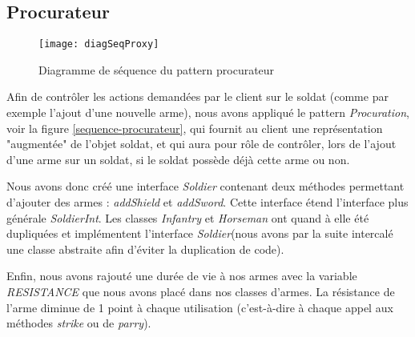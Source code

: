 \subsection{Procurateur}
\begin{figure}[h]
\begin{center}
    \texttt{[image: diagSeqProxy]}
\end{center}
    \caption{Diagramme de séquence du pattern procurateur}
    \label{sequence-procurateur}
\end{figure}

Afin de contrôler les actions demandées par le client sur le soldat (comme par exemple l'ajout d'une nouvelle arme), nous avons appliqué le pattern \emph{Procuration}, voir la figure \vref{sequence-procurateur}, qui fournit au client une représentation "augmentée" de l'objet soldat, et qui aura pour rôle de contrôler, lors de l'ajout d'une arme sur un soldat, si le soldat possède déjà cette arme ou non.

Nous avons donc créé une interface \emph{Soldier} contenant deux méthodes permettant d'ajouter des armes : \emph{addShield} et \emph{addSword}. Cette interface étend l'interface plus générale \emph{SoldierInt}. 
Les classes \emph{Infantry} et \emph{Horseman} ont quand à elle été dupliquées et implémentent l'interface \emph{Soldier}(nous avons par la suite intercalé une classe abstraite afin d'éviter la duplication de code).

Enfin, nous avons rajouté une durée de vie à nos armes avec la variable \emph{RESISTANCE} que nous avons placé dans nos classes d'armes. La résistance de l'arme diminue de 1 point à chaque utilisation (c'est-à-dire à chaque appel aux méthodes \emph{strike} ou de \emph{parry}).